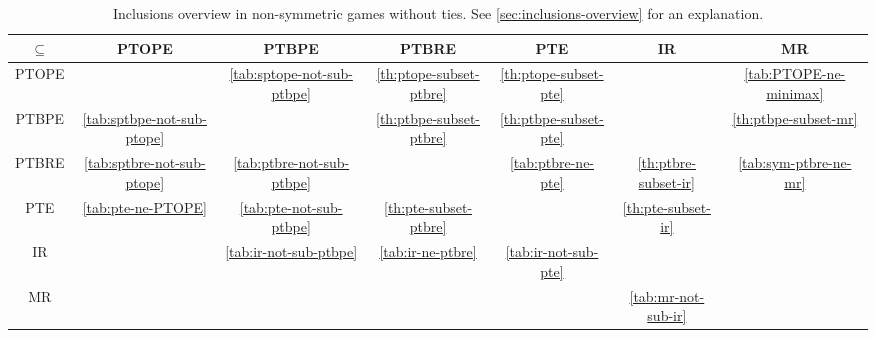 \begin{sidewaystable}
	\caption{Inclusions overview in non-symmetric games without ties. See \autoref{sec:inclusions-overview} for an explanation.}
	\label{tab:overview-nosym-nodup}
	\begin{tabular}{|c|c|c|c|c|c|c|}
		\hline
		$\subseteq$  & PTOPE & PTBPE & PTBRE & PTE & IR & MR \\
		\hline
		PTOPE & \cellcolor{gray!30} & \cellcolor{red!30} \autoref{tab:sptope-not-sub-ptbpe} & \cellcolor{green!30} \autoref{th:ptope-subset-ptbre} & \cellcolor{green!30} \autoref{th:ptope-subset-pte} & \cellcolor{green!15} & \cellcolor{red!30} \autoref{tab:PTOPE-ne-minimax} \\
		\hline
		PTBPE & \cellcolor{red!30} \autoref{tab:sptbpe-not-sub-ptope} & \cellcolor{gray!30} & \cellcolor{green!30} \autoref{th:ptbpe-subset-ptbre} & \cellcolor{green!30} \autoref{th:ptbpe-subset-pte} & \cellcolor{green!15} & \cellcolor{green!30} \autoref{th:ptbpe-subset-mr} \\
		\hline
		PTBRE & \cellcolor{red!30} \autoref{tab:sptbre-not-sub-ptope} & \cellcolor{red!30} \autoref{tab:ptbre-not-sub-ptbpe} & \cellcolor{gray!30} & \cellcolor{red!30} \autoref{tab:ptbre-ne-pte} & \cellcolor{green!30} \autoref{th:ptbre-subset-ir} & \cellcolor{red!30} \autoref{tab:sym-ptbre-ne-mr} \\
		\hline
		PTE & \cellcolor{red!30} \autoref{tab:pte-ne-PTOPE} & \cellcolor{red!30} \autoref{tab:pte-not-sub-ptbpe} & \cellcolor{green!30} \autoref{th:pte-subset-ptbre} & \cellcolor{gray!30} & \cellcolor{green!30} \autoref{th:pte-subset-ir} & \cellcolor{red!15} \\
		\hline
		IR & \cellcolor{red!15} & \cellcolor{red!30} \autoref{tab:ir-not-sub-ptbpe} & \cellcolor{red!30} \autoref{tab:ir-ne-ptbre} & \cellcolor{red!30} \autoref{tab:ir-not-sub-pte} & \cellcolor{gray!30} & \cellcolor{red!15} \\
		\hline
		MR & \cellcolor{red!15} & \cellcolor{red!15} & \cellcolor{red!15} & \cellcolor{red!15} & \cellcolor{red!30} \autoref{tab:mr-not-sub-ir} & \cellcolor{gray!30} \\
		\hline
		\end{tabular}
\end{sidewaystable}

